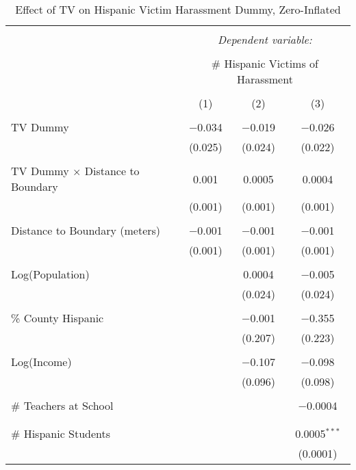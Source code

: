 
\begin{table}[!htbp] \centering 
  \caption{Effect of TV on Hispanic Victim Harassment Dummy, Zero-Inflated} 
  \label{} 
\begin{tabular}{@{\extracolsep{-2pt}}lccc} 
\\[-1.8ex]\hline 
\hline \\[-1.8ex] 
 & \multicolumn{3}{c}{\textit{Dependent variable:}} \\ 
\cline{2-4} 
\\[-1.8ex] & \multicolumn{3}{c}{\# Hispanic Victims of Harassment} \\ 
\\[-1.8ex] & (1) & (2) & (3)\\ 
\hline \\[-1.8ex] 
 TV Dummy & $-$0.034 & $-$0.019 & $-$0.026 \\ 
  & (0.025) & (0.024) & (0.022) \\ 
  & & & \\ 
 TV Dummy $\times$ Distance to Boundary & 0.001 & 0.0005 & 0.0004 \\ 
  & (0.001) & (0.001) & (0.001) \\ 
  & & & \\ 
 Distance to Boundary (meters) & $-$0.001 & $-$0.001 & $-$0.001 \\ 
  & (0.001) & (0.001) & (0.001) \\ 
  & & & \\ 
 Log(Population) &  & 0.0004 & $-$0.005 \\ 
  &  & (0.024) & (0.024) \\ 
  & & & \\ 
 \% County Hispanic &  & $-$0.001 & $-$0.355 \\ 
  &  & (0.207) & (0.223) \\ 
  & & & \\ 
 Log(Income) &  & $-$0.107 & $-$0.098 \\ 
  &  & (0.096) & (0.098) \\ 
  & & & \\ 
 \# Teachers at School &  &  & $-$0.0004 \\ 
  &  &  &  \\ 
  & & & \\ 
 \# Hispanic Students &  &  & 0.0005$^{***}$ \\ 
  &  &  & (0.0001) \\ 

\end{tabular}
\end{table}
